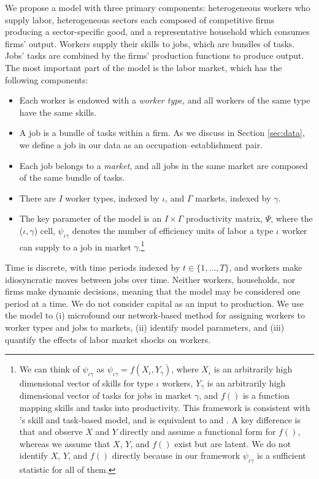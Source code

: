 \documentclass[12pt]{article}
\def\ig{\iota\gamma}
\def\g{\gamma}
\def\i{\iota}
\theoremstyle{definition}
\theoremstyle{plain}
\begin{document}
We propose a model with three primary components: heterogeneous workers who supply labor, heterogeneous sectors each composed of competitive firms producing a sector-specific good, and a representative household which consumes firms' output. Workers supply their skills to jobs, which are bundles of tasks. Jobs' tasks are combined by the firms' production functions to produce output. The most important part of the model is the labor market, which has the following components:
\begin{itemize}
	\item Each worker is endowed with a \emph{worker type}, and all workers of the same type have the same skills.
	\item A job is a bundle of tasks within a firm. As we discuss in Section \ref{sec:data}, we define a job in our data as an occupation--establishment pair.
	\item Each job belongs to a \emph{market}, and all jobs in the same market are composed of the same bundle of tasks. 
	\item There are $I$ worker types, indexed by $\i$, and $\Gamma$ markets, indexed by $\g$. 
	\item The key parameter of the model is an $I\times \Gamma$ productivity matrix, $\Psi$, where the ($\i,\g$) cell, $\psi_{\ig}$ denotes the number of efficiency units of labor a type $\i$ worker can supply to a job in market $\g$.\footnote{We can think of $\psi_{\ig}$ as $\psi_{\ig}=f(X_{\i},Y_{\g})$, where $X_{\i}$ is an arbitrarily high dimensional vector of skills for type $\i$ workers, $Y_{\g}$ is an arbitrarily high dimensional vector of tasks for jobs in market $\g$, and $f()$ is a function mapping skills and tasks into productivity. This framework is consistent with \citet{AcemogluAutor2011}'s skill and task-based model, and is equivalent to \citet{Lindenlaub2017} and \citet{Tan2018}. A key difference is that \citeauthor{Lindenlaub2017} and \citeauthor{Tan2018} observe $X$ and $Y$ directly and assume a functional form for $f()$, whereas we assume that $X$, $Y$, and $f()$ exist but are latent. We do not identify $X$, $Y$, and $f()$ directly because in our framework $\psi_{\ig}$ is a sufficient statistic for all of them. } 
\end{itemize}
Time is discrete, with time periods indexed by $t \in \{1,\dots,T\}$, and workers make idiosyncratic moves between jobs over time. Neither workers, households, nor firms make dynamic decisions, meaning that the model may be considered one period at a time.  We do not consider capital as an input to production. We use the model to (i) microfound our network-based method for assigning workers to worker types and jobs to markets, (ii) identify model parameters, and (iii) quantify the effects of labor market shocks on workers.
\end{document}
